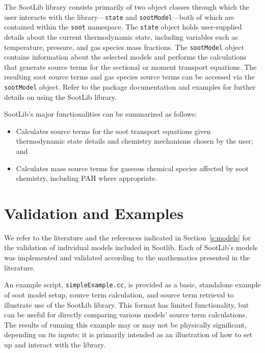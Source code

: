 \documentclass[preprint,letterpaper]{elsarticle}
\begin{document}
The SootLib library consists primarily of two object classes through which the user interacts with the library---\texttt{state} and \texttt{sootModel}---both of which are contained within the \texttt{soot} namespace. The \texttt{state} object holds user-supplied details about the current thermodynamic state, including variables such as temperature, pressure, and gas species mass fractions. The \texttt{sootModel} object contains information about the selected models and performs the calculations that generate source terms for the sectional or moment transport equations.
The resulting soot source terms and gas species source terms can be accessed via the \texttt{sootModel} object. Refer to the package documentation and examples for further details on using the SootLib library.

SootLib's major functionalities can be summarized as follows:
\begin{itemize}
    \item Calculates source terms for the soot transport equations given thermodynamic state details and chemistry mechanisms chosen by the user; and
    \item Calculates mass source terms for gaseous chemical species affected by soot chemistry, including PAH where appropriate.
\end{itemize}


\section{Validation and Examples}
\label{s:examples}

We refer to the literature and the references indicated in Section~\ref{s:models} for the validation of individual models included in Sootlib. Each of SootLib's models was implemented and validated according to the mathematics presented in the literature.

An example script, \texttt{simpleExample.cc}, is provided as a basic, standalone example of soot model setup, source term calculation, and source term retrieval to illustrate use of the SootLib library. This format has limited functionality, but can be useful for directly comparing various models' source term calculations. The results of running this example may or may not be physically significant, depending on its inputs; it is primarily intended as an illustration of how to set up and interact with the library.
\end{document}

